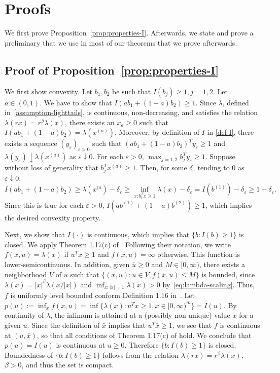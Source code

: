\documentclass[a4paper, a4wide, 10pt, reqno]{amsart}
\theoremstyle{plain}
\begin{document}
\section{Proofs}
\label{sec-proofs}
We first prove Proposition~\ref{prop:properties-I}. Afterwards, we state and prove a preliminary that we use in most of our theorems that we prove afterwards. 

\subsection*{Proof of Proposition~\ref{prop:properties-I}}
We first show convexity. Let $b_1, b_2$ be such that $I(b_j) \geq 1, j=1,2$. Let $a\in (0,1)$. We have to show that 
$I(ab_1+(1-a) b_2)\geq 1$. 
Since $\lambda$, defined in~\eqref{assumption-lighttails}, is continuous, non-decreasing, and satisfies the relation $\lambda (rx) = r^\beta \lambda (x)$, there exists an $x_{a}\geq 0$ such that 
$I(ab_1+(1-a) b_2) = \lambda(x^{(a)})$. Moreover, by definition of $I$ in \eqref{def-I}, there exists a sequence $(y_\varepsilon)_{\varepsilon>0}$ such that $(ab_1+(1-a) b_2)^Ty_\varepsilon\ge 1$ and $\lambda(y_\varepsilon)\downarrow \lambda(x^{(a)})$ as $\varepsilon\downarrow 0$. For each $\varepsilon>0$, 
$\max_{j=1,2}b_j^T y_\varepsilon\ge 1$. Suppose without loss of generality that $b_j^T x^{(a)} \geq 1$. Then, for some $\delta_\varepsilon$ tending to $0$ as $\varepsilon\downarrow 0$,
\[
   I(ab_1+(1-a) b_2) \ge \lambda (x^{(a}) -\delta_\varepsilon \geq 
   \inf_{x: b_1^T x \geq 1}  \lambda (x)-\delta_\varepsilon = I(b^{(1)}) -\delta_\varepsilon \geq 1-\delta_\varepsilon.
\]
Since this is true for each $\varepsilon>0$, $I(ab^{(1)}+(1-a) b^{(2)})\ge 1$, which implies the desired convexity property.


\smallskip
Next, we show that $I(\cdot)$ is continuous, which implies that $\{b: I(b)\ge 1\}$ is closed.
We apply Theorem 1.17(c) of \cite{RockWets98}. Following their notation, we write $f(x,u)=\lambda (x)$ if $u^Tx \geq 1$ and $f(x,u)=\infty$ otherwise. This function is lower-semicontinuous. In addition, given $\bar u\geq 0$ and $M\in [0,\infty)$, there exists a neighborhood $V$ of $\bar u$ such that $\{(x,u): u\in V, f(x,u)\leq M\}$ is bounded, since $\lambda(x) = |x|^\beta \lambda (x/|x|)$ and $\inf_{x: |x|=1} \lambda(x)>0$ by~\eqref{eq:lambda-scaling}. Thus, $f$ is uniformly level bounded conform Definition 1.16 in~\cite{RockWets98}. Let $p(u):=\inf_xf(x,u)=\inf\{\lambda(x): u^Tx\ge 1, x\in[0,\infty)^m\}=I(u)$. By continuity of $\lambda$, the infimum is attained at a (possibly non-unique) value $\bar x$ for a given $u$. 
Since the definition of $\bar x$ implies that $ u^T \bar x\geq 1$, we see that $f$ is continuous at $(u, \bar x)$, so that all conditions of Theorem 1.17(c) of \cite{RockWets98} hold. We conclude that $p(u)=I(u)$ is continuous at $u\geq 0$. Therefore $\{b: I(b)\ge 1\}$ is closed. Boundedness of $\{b: I(b)\ge 1\}$ follows from the relation $\lambda (rx) = r^\beta \lambda (x)$, $\beta>0$, and thus the set is compact.  
\end{document}
